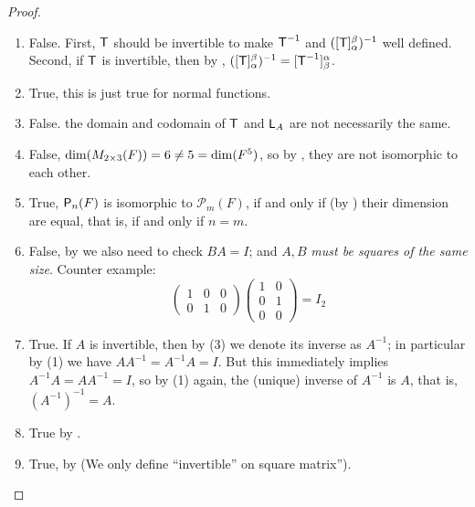 \begin{proof} \ 

\begin{enumerate}
\item False.
    First, \(\textsf{T}\) should be invertible to make \(\textsf{T}^{-1}\) and \(([\textsf{T}]_{\alpha}^{\beta})^{-1}\) well defined.
    Second, if \(\textsf{T}\) is invertible, then by , \(([\textsf{T}]_{\alpha}^{\beta})^{-1} = [\textsf{T}^{-1}]_{\beta}^{\alpha}\).
\item True, this is just true for normal functions.
\item False. the domain and codomain of \(\textsf{T}\) and \(\textsf{L}_A\) are not necessarily the same.
\item False, \(\dim(M_{2 \times 3}(F)) = 6 \ne 5 = \dim(F^5)\), so by , they are not isomorphic to each other.
\item True, \(\textsf{P}_n(F)\) is isomorphic to \(\mathcal{P}_m(F)\), if and only if (by ) their dimension are equal, that is, if and only if \(n = m\).
\item False, by  we also need to check \(BA = I\); and \(A, B\) \emph{must be squares of the same size}.
    Counter example:
    \[
        \left(\begin{array}{lll}
            1 & 0 & 0 \\
            0 & 1 & 0
        \end{array}\right)
        \left(\begin{array}{ll}
            1 & 0 \\
            0 & 1 \\
            0 & 0
        \end{array}\right) = I_2
    \]
\item True.
    If \(A\) is invertible, then by (3) we denote its inverse as \(A^{-1}\);
    in particular by (1) we have \(A A^{-1} = A^{-1} A = I\).
    But this immediately implies \(A^{-1} A = A A^{-1} = I\), so by (1) again, the (unique) inverse of \(A^{-1}\) is \(A\), that is, \((A^{-1})^{-1} = A\).
\item True by .
\item True, by  (We only define ``invertible'' on square matrix'').
\end{enumerate}
\end{proof}

